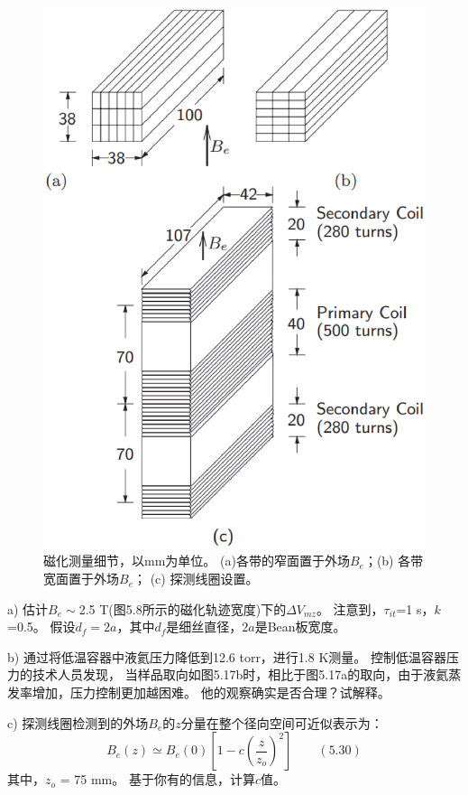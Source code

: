 \begin{figure}[htbp]
	\centering
	\includegraphics[scale=0.5]{chpt5/figs/fig5.17.eps}
	\caption{磁化测量细节，以mm为单位。
		(a)各带的窄面置于外场$B_e$；(b) 各带宽面置于外场$B_e$； (c) 探测线圈设置。}
\end{figure}

a) 估计$B_e\sim$2.5 T(图5.8所示的磁化轨迹宽度)下的$\Delta V_{mz}$。
注意到，$\tau_{it}$=1 s，$k$=0.5。
假设$d_f=2a$，其中$d_f$是细丝直径，$2a$是Bean板宽度。

b) 通过将低温容器中液氦压力降低到12.6 torr，进行1.8 K测量。
控制低温容器压力的技术人员发现，
当样品取向如图5.17b时，相比于图5.17a的取向，由于液氦蒸发率增加，压力控制更加越困难。
他的观察确实是否合理？试解释。

c) 探测线圈检测到的外场$B_e$的$z$分量在整个径向空间可近似表示为：
\begin{equation}%
B_{e}(z)\simeq B_{e}(0)[1-c(\frac{z}{z_{o}})^{2}]\qquad(5.30)
\end{equation}
其中，$z_o$ = 75 mm。
基于你有的信息，计算$c$值。 

